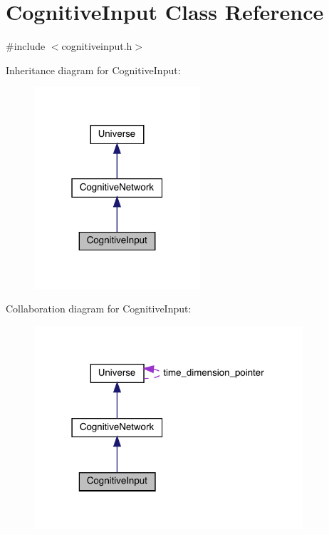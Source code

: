 \hypertarget{class_cognitive_input}{}\section{Cognitive\+Input Class Reference}
\label{class_cognitive_input}


{\ttfamily \#include $<$cognitiveinput.\+h$>$}



Inheritance diagram for Cognitive\+Input\+:\nopagebreak
\begin{figure}[H]
\begin{center}
\leavevmode
\includegraphics[width=175pt]{class_cognitive_input__inherit__graph}
\end{center}
\end{figure}


Collaboration diagram for Cognitive\+Input\+:\nopagebreak
\begin{figure}[H]
\begin{center}
\leavevmode
\includegraphics[width=283pt]{class_cognitive_input__coll__graph}
\end{center}
\end{figure}
